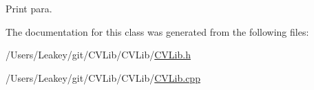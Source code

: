 Print para. 



The documentation for this class was generated from the following files\+:\begin{DoxyCompactItemize}
\item 
/\+Users/\+Leakey/git/\+C\+V\+Lib/\+C\+V\+Lib/\hyperlink{_c_v_lib_8h}{C\+V\+Lib.\+h}\item 
/\+Users/\+Leakey/git/\+C\+V\+Lib/\+C\+V\+Lib/\hyperlink{_c_v_lib_8cpp}{C\+V\+Lib.\+cpp}\end{DoxyCompactItemize}

